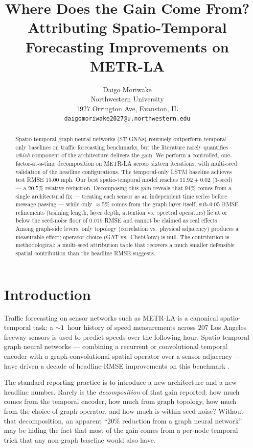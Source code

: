 \documentclass{article}
\title{Where Does the Gain Come From? Attributing Spatio-Temporal\\Forecasting Improvements on METR-LA}
\author{%
  Daigo Moriwake \\
  Northwestern University \\
  1927 Orrington Ave, Evanston, IL \\
  \texttt{daigomoriwake2027@u.northwestern.edu}
}
\begin{document}
\maketitle

\begin{abstract}
Spatio-temporal graph neural networks (ST-GNNs) routinely outperform temporal-only baselines on traffic forecasting benchmarks, but the literature rarely quantifies \emph{which} component of the architecture delivers the gain. We perform a controlled, one-factor-at-a-time decomposition on METR-LA across sixteen iterations, with multi-seed validation of the headline configurations. The temporal-only LSTM baseline achieves test RMSE $15.00$ mph. Our best spatio-temporal model reaches $11.92 \pm 0.02$ (3-seed) --- a $20.5\%$ relative reduction. Decomposing this gain reveals that $94\%$ comes from a single architectural fix --- treating each sensor as an independent time series before message passing --- while only $\approx 5\%$ comes from the graph layer itself; sub-$0.05$ RMSE refinements (training length, layer depth, attention vs.\ spectral operators) lie at or below the seed-noise floor of $0.019$ RMSE and cannot be claimed as real effects. Among graph-side levers, only topology (correlation vs.\ physical adjacency) produces a measurable effect; operator choice (GAT vs.\ ChebConv) is null. The contribution is methodological: a multi-seed attribution table that recovers a much smaller defensible spatial contribution than the headline RMSE suggests.
\end{abstract}

\section{Introduction}
\label{sec:intro}

Traffic forecasting on sensor networks such as METR-LA \cite{li2018dcrnn} is a canonical spatio-temporal task: a $\sim 1$~hour history of speed measurements across $207$ Los Angeles freeway sensors is used to predict speeds over the following hour. Spatio-temporal graph neural networks --- combining a recurrent or convolutional temporal encoder with a graph-convolutional spatial operator over a sensor adjacency --- have driven a decade of headline-RMSE improvements on this benchmark \cite{li2018dcrnn, yu2018stgcn, wu2019graphwavenet}.

The standard reporting practice is to introduce a new architecture and a new headline number. Rarely is the \emph{decomposition} of that gain reported: how much comes from the temporal encoder, how much from graph topology, how much from the choice of graph operator, and how much is within seed noise? Without that decomposition, an apparent ``$20\%$ reduction from a graph neural network'' may be hiding the fact that most of the gain comes from a per-node temporal trick that any non-graph baseline would also have.
\end{document}
